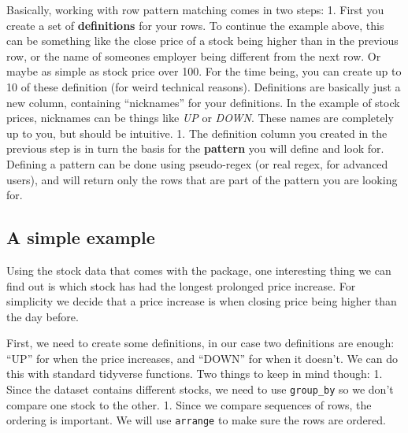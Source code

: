 \documentclass[]{article}
\begin{document}
Basically, working with row pattern matching comes in two steps: 1.
First you create a set of \textbf{definitions} for your rows. To
continue the example above, this can be something like the close price
of a stock being higher than in the previous row, or the name of
someones employer being different from the next row. Or maybe as simple
as stock price over 100. For the time being, you can create up to 10 of
these definition (for weird technical reasons). Definitions are
basically just a new column, containing ``nicknames'' for your
definitions. In the example of stock prices, nicknames can be things
like \emph{UP} or \emph{DOWN}. These names are completely up to you, but
should be intuitive. 1. The definition column you created in the
previous step is in turn the basis for the \textbf{pattern} you will
define and look for. Defining a pattern can be done using pseudo-regex
(or real regex, for advanced users), and will return only the rows that
are part of the pattern you are looking for.

\hypertarget{a-simple-example}{%
\subsection{A simple example}\label{a-simple-example}}

Using the stock data that comes with the package, one interesting thing
we can find out is which stock has had the longest prolonged price
increase. For simplicity we decide that a price increase is when closing
price being higher than the day before.

First, we need to create some definitions, in our case two definitions
are enough: ``UP'' for when the price increases, and ``DOWN'' for when
it doesn't. We can do this with standard tidyverse functions. Two things
to keep in mind though: 1. Since the dataset contains different stocks,
we need to use \texttt{group\_by} so we don't compare one stock to the
other. 1. Since we compare sequences of rows, the ordering is important.
We will use \texttt{arrange} to make sure the rows are ordered.
\end{document}
